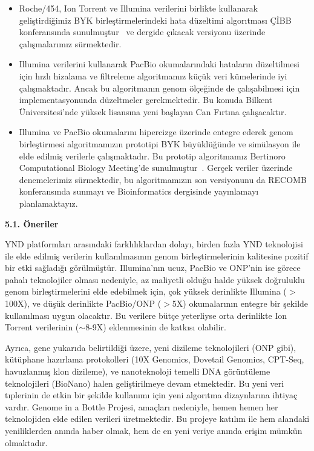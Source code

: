 \documentclass[11pt]{article}
\begin{document}
\begin{itemize}
\item Roche/454, Ion Torrent ve Illumina verilerini birlikte kullanarak geliştirdiğimiz BYK birleştirmelerindeki hata düzeltimi algorıtması ÇİBB konferansında sunulmuştur~\cite{Kavak2015a} ve dergide çıkacak versiyonu üzerinde çalışmalarımız sürmektedir.
\item Illumina verilerini kullanarak PacBio okumalarındaki hataların düzeltilmesi için hızlı hizalama ve filtreleme algoritmamız küçük veri kümelerinde iyi çalışmaktadır. Ancak bu algoritmanın genom ölçeğinde de çalışabilmesi için implementasyonunda düzeltmeler gerekmektedir. Bu konuda Bilkent Üniversitesi'nde yüksek lisansına yeni başlayan Can Fırtına çalışacaktır.
\item Illumina ve PacBio okumalarını hipercizge üzerinde entegre ederek genom birleştirmesi algoritmamızın prototipi BYK büyüklüğünde ve simülasyon ile elde edilmiş verilerle çalışmaktadır. Bu prototip algoritmamız Bertinoro Computational Biology Meeting'de sunulmuştur~\cite{Ashyralyyev2015}. Gerçek veriler üzerinde denemelerimiz sürmektedir, bu algoritmamızın son versiyonunu da RECOMB konferansında sunmayı ve Bioinformatics dergisinde yayınlamayı planlamaktayız.
\end{itemize}

\noindent
{\bf \Large 5.1. Öneriler}
YND platformları arasındaki farklılıklardan dolayı, birden fazla YND teknolojisi ile elde edilmiş verilerin kullanılmasının genom birleştirmelerinin kalitesine pozitif bir etki sağladığı görülmüştür. Illumina'nın ucuz, PacBio ve ONP'nin ise görece pahalı teknolojiler olması nedeniyle, az maliyetli olduğu halde yüksek doğruluklu genom birleştirmelerini elde edebilmek için, çok yüksek derinlikte Illumina ($>$100X), ve düşük derinlikte PacBio/ONP ($>$5X) okumalarının entegre bir şekilde kullanılması uygun olacaktır. Bu verilere bütçe yeterliyse orta derinlikte Ion Torrent verilerinin ($\sim$8-9X) eklenmesinin de katkısı olabilir.

Ayrıca, gene yukarıda belirtildiği üzere, yeni dizileme teknolojileri (ONP gibi), kütüphane hazırlama protokolleri (10X Genomics, Dovetail Genomics, CPT-Seq, havuzlanmış klon dizileme), ve nanoteknoloji temelli DNA görüntüleme teknolojileri (BioNano) halen geliştirilmeye devam etmektedir. Bu yeni veri tıplerinin de etkin bir şekilde kullanımı için yeni algorıtma dizaynlarına ihtiyaç vardır. Genome in a Bottle Projesi, amaçları nedeniyle, hemen hemen her teknolojiden elde edilen verileri üretmektedir. Bu projeye katılım ile hem alandaki yeniliklerden anında haber olmak, hem de en yeni veriye anında erişim mümkün olmaktadır.

{\small 



}




\label{endsectionb1}
\end{document}
